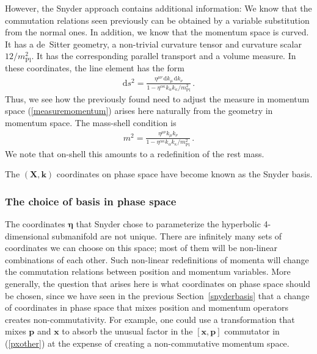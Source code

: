 \documentclass{article}
\def\beqn{\begin{eqnarray}}
\def\eeqn{\end{eqnarray}}
\begin{document}
However, the Snyder approach contains additional information: We know that the commutation
relations seen previously can be obtained by a variable substitution from the normal ones. In
addition, we know that the momentum space is curved. It has a de~Sitter  geometry, a non-trivial curvature tensor and curvature scalar
$12/m_{\mathrm{Pl}}^2$. It has the corresponding parallel transport and a volume measure. In these coordinates, 
the line element has the form
\beqn
\mathrm{d}s^2 = \frac{\eta^{\mu \nu} \, \mathrm{d}k_\mu \, \mathrm{d}k_\nu}{1 - \eta^{\alpha \kappa} k_\alpha k_\kappa/m_{\mathrm{Pl}}^2} \,.
\eeqn
Thus, we see how the previously found need to adjust the measure in momentum space (\ref{measuremomentum}) arises here naturally
from the geometry in momentum space. The mass-shell condition is 
\beqn
m^2 = \frac{\eta^{\mu \nu} k_\mu k_\nu}{1 - \eta^{\alpha \kappa} k_\alpha k_\kappa/m_{\mathrm{Pl}}^2} \,. \label{snydershell}
\eeqn
We note that on-shell this amounts to a redefinition of the rest mass. 

The $(\mathbf{X},\mathbf{k})$ coordinates on phase space have become known as the Snyder basis.

\subsubsection{The choice of basis in phase space}
\label{otherbasis}

The coordinates $\boldsymbol{\eta}$ that Snyder chose to parameterize the hyperbolic 4-dimensional submanifold are not
unique. There are infinitely many sets of coordinates we can choose on this space; most of them will be non-linear
combinations of each other. Such non-linear redefinitions of momenta will change the commutation relations between
position and momentum variables. More generally, the question
that arises here is what coordinates on phase space should be chosen, since we have seen in the
previous Section~\ref{snyderbasis} that a change of coordinates in phase space that mixes position and momentum operators
creates non-commutativity. For example, one could use a transformation that mixes $\mathbf{p}$ and $\mathbf{x}$ to
absorb the unusual factor in the $[\mathbf{x},\mathbf{p}]$ commutator in (\ref{pxother}) at the expense of creating 
a non-commutative momentum space. 
\end{document}
